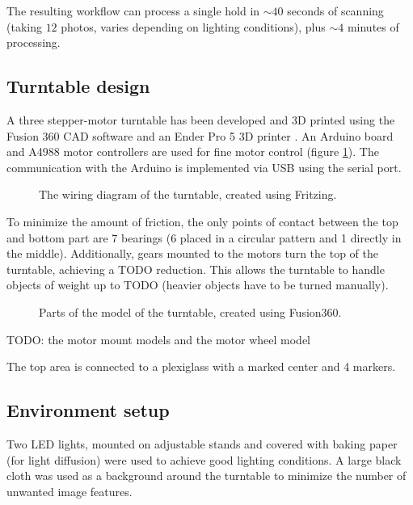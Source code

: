 The resulting workflow can process a single hold in $\sim 40$ seconds of scanning (taking $12$ photos, varies depending on lighting conditions), plus  $\sim4$ minutes of processing.

\subsection{Turntable design}
A three stepper-motor turntable has been developed and 3D printed using the Fusion 360 CAD software and an Ender Pro 5 3D printer \label{ref:turntable}.
An Arduino board and A4988 motor controllers are used for fine motor control (figure \ref{fig:wiring}).
The communication with the Arduino is implemented via USB using the serial port.

\begin{figure}
	\centering
	
	\caption{The wiring diagram of the turntable, created using Fritzing.}
	\label{fig:wiring}
\end{figure}

To minimize the amount of friction, the only points of contact between the top and bottom part are 7 bearings (6 placed in a circular pattern and 1 directly in the middle).
Additionally, gears mounted to the motors turn the top of the turntable, achieving a TODO reduction.
This allows the turntable to handle objects of weight up to TODO (heavier objects have to be turned manually).

\begin{figure}
	\centering
	\hfill
	\hfill
	\caption{Parts of the model of the turntable, created using Fusion360.}%
	\label{fig:turntable}
\end{figure}

TODO: the motor mount models and the motor wheel model

The top area is connected to a plexiglass with a marked center and 4 markers.

\subsection{Environment setup}
Two LED lights, mounted on adjustable stands and covered with baking paper (for light diffusion) were used to achieve good lighting conditions.
A large black cloth was used as a background around the turntable to minimize the number of unwanted image features.

